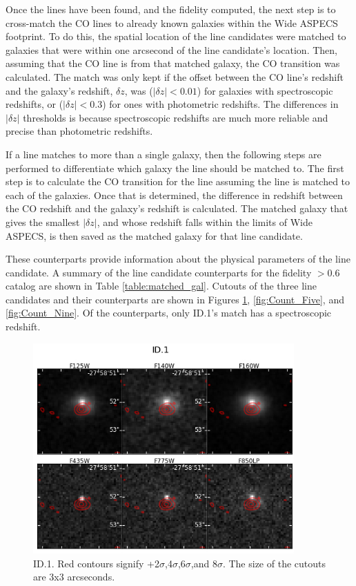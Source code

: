 Once the lines have been found, and the fidelity computed, the next step is to cross-match the CO lines to already known galaxies within the Wide ASPECS footprint. To do this, the spatial location of the line candidates were matched to galaxies that were within one arcsecond of the line candidate's location. Then, assuming that the CO line is from that matched galaxy, the CO transition was calculated. The match was only kept if the offset between the CO line's redshift and the galaxy's redshift, $\delta z$, was ($|\delta z| < 0.01$) for galaxies with spectroscopic redshifts, or ($|\delta z| < 0.3$) for ones with photometric redshifts. The differences in $|\delta z|$ thresholds is because spectroscopic redshifts are much more reliable and precise than photometric redshifts. 

If a line matches to more than a single galaxy, then the following steps are performed to differentiate which galaxy the line should be matched to. The first step is to calculate the CO transition for the line assuming the line is matched to each of the galaxies. Once that is determined, the difference in redshift between the CO redshift and the galaxy's redshift is calculated. The matched galaxy that gives the smallest $|\delta z|$, and whose redshift falls within the limits of Wide ASPECS, is then saved as the matched galaxy for that line candidate. 

These counterparts provide information about the physical parameters of the line candidate. A summary of the line candidate counterparts for the fidelity $>$0.6 catalog are shown in Table \ref{table:matched_gal}. Cutouts of the three line candidates and their counterparts are shown in Figures \ref{fig:Count_One}, \ref{fig:Count_Five}, and \ref{fig:Count_Nine}. Of the counterparts, only ID.1's match has a spectroscopic redshift.

\begin{figure}[!htbp]
\centering \includegraphics[width=100mm]{Matched/ASPECS_Cutout_0.jpg}
\caption{ID.1. Red contours signify +2$\sigma$,4$\sigma$,6$\sigma$,and 8$\sigma$. The size of the cutouts are 3x3 arcseconds.}
\label{fig:Count_One}
\end{figure}


